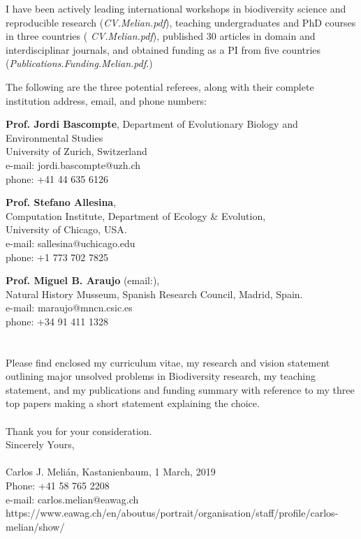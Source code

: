 \documentclass[a4paper,12pt]{letter}
\begin{document}
I have been actively leading international workshops in biodiversity
science and reproducible research ({\em CV.Melian.pdf}), teaching
undergraduates and PhD courses in three countries ({\em
  CV.Melian.pdf}), published 30 articles in domain and
interdisciplinar journals, and obtained funding as a PI from five
countries ({\em Publications.Funding.Melian.pdf}.)

The following are the three potential referees, along with their
complete institution address, email, and phone numbers:
\\
\item {\bf Prof. Jordi Bascompte}, Department of Evolutionary Biology and Environmental Studies\\
University of Zurich, Switzerland\\
e-mail: jordi.bascompte@uzh.ch\\
phone: +41 44 635 6126\\
\item {\bf Prof. Stefano Allesina},\\ 
Computation Institute, Department of Ecology \& Evolution,\\
University of Chicago, USA.\\
e-mail: sallesina@uchicago.edu\\
phone: +1 773 702 7825 \\
\item {\bf Prof. Miguel B. Araujo} (email:),\\
  Natural History Musseum, Spanish Research Council, Madrid, Spain.\\
  e-mail: maraujo@mncn.csic.es\\
  phone: +34 91 411 1328\\
  \\
  \\
  Please find enclosed my curriculum vitae, my research and vision
  statement outlining major unsolved problems in Biodiversity
  research, my teaching statement, and my publications and funding
  summary with reference to my three top papers making a short
  statement explaining the choice.
  \\
  \\
  Thank you for your consideration.  \vspace{0.2 in}
  \\
  Sincerely Yours,
  \\
  \\
  Carlos J. Meli\'an,\hspace{1.75 in}  Kastanienbaum, 1 March, 2019\\
  Phone: +41 58 765 2208\\
  e-mail: carlos.melian@eawag.ch\\
  https://www.eawag.ch/en/aboutus/portrait/organisation/staff/profile/carlos-melian/show/
\end{document}
